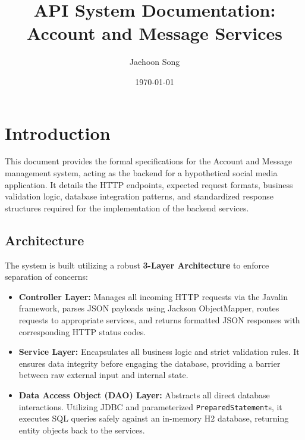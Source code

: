 \documentclass{article}
\title{API System Documentation: Account and Message Services}
\author{Jaehoon Song}
\date{\today}
\begin{document}
\maketitle


\section{Introduction}
This document provides the formal specifications for the Account and Message management system, acting as the backend for a hypothetical social media application. It details the HTTP endpoints, expected request formats, business validation logic, database integration patterns, and standardized response structures required for the implementation of the backend services.

\subsection{Architecture}
The system is built utilizing a robust \textbf{3-Layer Architecture} to enforce separation of concerns:
\begin{itemize}
    \item \textbf{Controller Layer:} Manages all incoming HTTP requests via the Javalin framework, parses JSON payloads using Jackson ObjectMapper, routes requests to appropriate services, and returns formatted JSON responses with corresponding HTTP status codes.
    \item \textbf{Service Layer:} Encapsulates all business logic and strict validation rules. It ensures data integrity before engaging the database, providing a barrier between raw external input and internal state.
    \item \textbf{Data Access Object (DAO) Layer:} Abstracts all direct database interactions. Utilizing JDBC and parameterized \texttt{PreparedStatement}s, it executes SQL queries safely against an in-memory H2 database, returning entity objects back to the services.
\end{itemize}
\end{document}
